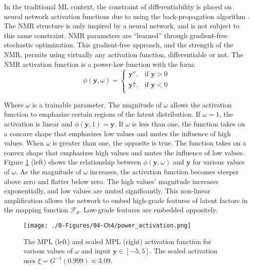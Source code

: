 In the traditional \gls{ML} context, the constraint of differentiability is placed on neural network activation functions due to using the back-propagation algorithm \citep{rojas1996backpropagation}. The \gls{NMR} structure is only inspired by a neural network, and is not subject to this same constraint. \Gls{NMR} parameters are ``learned'' through gradient-free stochastic optimization. This gradient-free approach, and the strength of the \gls{NMR}, permits using virtually any activation function, differentiable or not. The \gls{NMR} activation function is a power-law function with the form:
\begin{equation}
    \phi \left( \mathbf{y}, \omega \right) =
    \begin{cases}
        \mathbf{y}^{\omega},           & \text{if $\mathbf{y} > 0$} \\
        \mathbf{y}^{\frac{1}{\omega}}, & \text{if $\mathbf{y} < 0$} \\
    \end{cases}
    \label{eq:power}
\end{equation}


Where $\omega$ is a trainable parameter. The magnitude of $\omega$ allows the activation function to emphasize certain regions of the latent distribution. If $\omega = 1$, the activation is linear and $\phi \left( \mathbf{y}, 1 \right)=\mathbf{y}$. If $\omega$ is less than one, the function takes on a concave shape that emphasizes low values and mutes the influence of high values. When $\omega$ is greater than one, the opposite is true. The function takes on a convex shape that emphasizes high values and mutes the influence of low values. Figure \ref{fig:power_activation} (left) shows the relationship between $\phi \left( \mathbf{y}, \omega \right)$ and $\mathbf{y}$ for various values of $\omega$. As the magnitude of $\omega$ increases, the activation function becomes steeper above zero and flatter below zero. The high values' magnitude increases exponentially, and low values are muted significantly. This non-linear amplification allows the network to embed high-grade features of latent factors in the mapping function $\mathcal{F}_{\theta}$. Low-grade features are embedded oppositely.

\begin{figure}[htb!]
    \centering
    \texttt{[image: ./0-Figures/04-Ch4/power\_activation.png]}
    \caption{The \gls{MPL} (left) and scaled \gls{MPL} (right) activation function for various values of $\omega$ and input $\mathbf{y} \in [-5,5]$. The scaled activation uses $\xi = G^{-1}(0.999) \approx 3.09$. }
    \label{fig:power_activation}
\end{figure}


